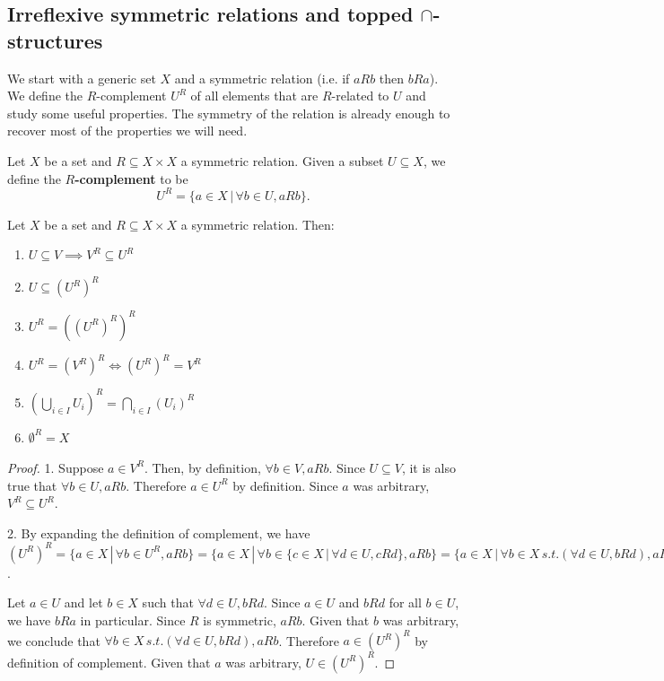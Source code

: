 \subsection{Irreflexive symmetric relations and topped $\cap$-structures}

We start with a generic set $X$ and a symmetric relation (i.e. if $aRb$ then $bRa$). We define the $R$-complement $U^R$ of all elements that are $R$-related to $U$ and study some useful properties. The symmetry of the relation is already enough to recover most of the properties we will need.

\begin{mathSection}
	\begin{defn}
		Let $X$ be a set and $R \subseteq X \times X$ a symmetric relation. Given a subset $U \subseteq X$, we define the \textbf{$R$-complement} to be
		$$ U^{R} = \{ a \in X \, | \, \forall b \in U, aRb  \}. $$
	\end{defn}
	
	\begin{prop}\label{pm_es_rComplProps}
		Let $X$ be a set and $R \subseteq X \times X$ a symmetric relation. Then:
		\begin{enumerate}
			\item $U \subseteq V \implies V^{R} \subseteq U^{R}$
			\item $U \subseteq (U^{R})^{R}$
			\item $U^{R} = ((U^{R})^{R})^{R}$
			\item $U^{R} = (V^{R})^{R} \iff (U^{R})^{R} = V^{R}$
			\item $(\bigcup_{i \in I} U_i )^{R} = \bigcap_{i \in I} (U_i)^{R}$
			\item $\emptyset^{R} = X$
		\end{enumerate}
	\end{prop}
	
	\begin{proof}
		1. Suppose $a \in V^{R}$. Then, by definition, $\forall b \in V, aRb$. Since $U \subseteq V$, it is also true that $\forall b \in U, aRb$. Therefore $a \in U^{R}$ by definition. Since $a$ was arbitrary, $V^{R} \subseteq U^{R}$.
		
		2. By expanding the definition of complement, we have $(U^{R})^{R}=\{ a \in X \, | \, \forall b \in U^{R}, aRb \} = \{ a \in X \, | \, \forall b \in \{ c \in X \, | \, \forall d \in U, cRd  \}, aRb \} = \{ a \in X \, | \, \forall b \in X \, s.t. (\forall d \in U, bRd), aRb \}$.
		
		Let $a \in U$ and let $b \in X$ such that $\forall d \in U, bRd$. Since $a \in U$ and $bRd$ for all $b \in U$, we have $bRa$ in particular. Since $R$ is symmetric, $aRb$. Given that $b$ was arbitrary, we conclude that $\forall b \in X \, s.t. (\forall d \in U, bRd), aRb$. Therefore $a \in (U^{R})^{R}$ by definition of complement. Given that $a$ was arbitrary, $U \in (U^{R})^{R}$.
		

\end{proof}
\end{mathSection}
